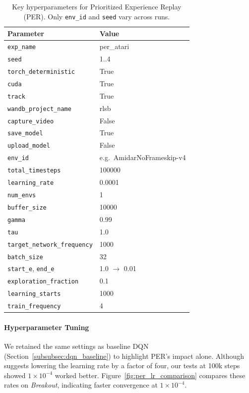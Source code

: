 \begin{table}
	\caption{Key hyperparameters for Prioritized Experience Replay (PER). Only \texttt{env\_id} and \texttt{seed} vary across runs.}
	\label{tab:per_hyperparams}
	\centering
	\begin{tabular}{ll}
		\toprule
		\textbf{Parameter} & \textbf{Value} \\
		\midrule
		\texttt{exp\_name}                & per\_atari \\
		\texttt{seed}                     & 1..4 \\
		\texttt{torch\_deterministic}     & True \\
		\texttt{cuda}                     & True \\
		\texttt{track}                    & True \\
		\texttt{wandb\_project\_name}     & rlsb \\
		\texttt{capture\_video}           & False \\
		\texttt{save\_model}              & True \\
		\texttt{upload\_model}            & False \\
		\texttt{env\_id}                  & e.g.\ AmidarNoFrameskip-v4 \\
		\texttt{total\_timesteps}         & 100000 \\
		\texttt{learning\_rate}           & 0.0001 \\
		\texttt{num\_envs}                & 1 \\
		\texttt{buffer\_size}             & 10000 \\
		\texttt{gamma}                    & 0.99 \\
		\texttt{tau}                      & 1.0 \\
		\texttt{target\_network\_frequency} & 1000 \\
		\texttt{batch\_size}             & 32 \\
		\texttt{start\_e}, \texttt{end\_e} & 1.0 $\to$ 0.01 \\
		\texttt{exploration\_fraction}    & 0.1 \\
		\texttt{learning\_starts}         & 1000 \\
		\texttt{train\_frequency}         & 4 \\
		\bottomrule
	\end{tabular}
\end{table}

\paragraph{Hyperparameter Tuning}
We retained the same settings as baseline DQN (Section~\ref{subsubsec:dqn_baseline}) to highlight PER’s impact alone. Although \cite{schaul:prioritized} suggests lowering the learning rate by a factor of four, our tests at 100k steps showed $1\times10^{-4}$ worked better. Figure~\ref{fig:per_lr_comparison} compares these rates on \emph{Breakout}, indicating faster convergence at $1\times10^{-4}$.  

